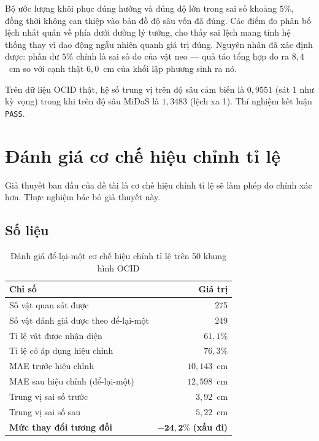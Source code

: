 Bộ ước lượng khôi phục đúng hướng và đúng độ lớn trong sai số khoảng $5\%$, đồng thời không can
thiệp vào bản đồ độ sâu vốn đã đúng. Các điểm đo phân bố lệch nhất quán về phía dưới đường lý tưởng, cho thấy sai lệch mang tính hệ thống thay vì dao động ngẫu nhiên quanh giá trị đúng. Nguyên nhân đã xác định được:
phần dư $5\%$ chính là sai số đo của vật neo --- quả táo tổng hợp đo ra $8{,}4$~cm so với cạnh
thật $6{,}0$~cm của khối lập phương sinh ra nó.

Trên dữ liệu OCID thật, hệ số trung vị trên độ sâu cảm biến là $0{,}9551$ (sát 1 như kỳ vọng)
trong khi trên độ sâu MiDaS là $1{,}3483$ (lệch xa 1). Thí nghiệm kết luận \texttt{PASS}.

\section{Đánh giá cơ chế hiệu chỉnh tỉ lệ}

Giả thuyết ban đầu của đề tài là cơ chế hiệu chỉnh tỉ lệ sẽ làm phép đo chính xác hơn. Thực
nghiệm bác bỏ giả thuyết này.

\subsection{Số liệu}

\begin{table}[H]
\centering
\caption{Đánh giá để-lại-một cơ chế hiệu chỉnh tỉ lệ trên 50 khung hình OCID}
\label{tab:hieu_chinh}
\small
\begin{tabularx}{\textwidth}{X r}
\toprule
\textbf{Chỉ số} & \textbf{Giá trị} \\
\midrule
Số vật quan sát được & 275 \\
Số vật đánh giá được theo để-lại-một & 249 \\
Tỉ lệ vật được nhận diện & $61{,}1\%$ \\
Tỉ lệ có áp dụng hiệu chỉnh & $76{,}3\%$ \\
\midrule
MAE trước hiệu chỉnh & $10{,}143$~cm \\
MAE sau hiệu chỉnh (để-lại-một) & $12{,}598$~cm \\
Trung vị sai số trước & $3{,}92$~cm \\
Trung vị sai số sau & $5{,}22$~cm \\
\textbf{Mức thay đổi tương đối} & $\mathbf{-24{,}2\%}$ \textbf{(xấu đi)} \\
\bottomrule
\end{tabularx}
\end{table}

